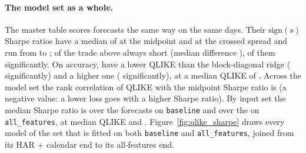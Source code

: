 \paragraph{The model set as a whole.} The master table scores \cmMasterN{} forecasts the %
same way on the same days. Their $\mathrm{sign}(s)$ Sharpe ratios have a median of
\cmMasterMedSh{} at the midpoint and \cmMasterMedShX{} at the crossed spread and run from
\cmMasterShMin{} to \cmMasterShMax; \cmMasterVsShortAbove{} of the \cmMasterVsShortN{}
trade above always short (median difference \cmMasterVsShortMed), \cmMasterVsShortAboveSig{}
of them significantly. On accuracy, \cmMasterQVsRefBelow{} have a lower QLIKE than the
block-diagonal ridge (\cmMasterQVsRefBelowSig{} significantly) and \cmMasterQVsRefAbove{} a
higher one (\cmMasterQVsRefAboveSig{} significantly), at a median QLIKE of \cmMasterMedQ.
Across the model set the rank correlation of QLIKE with the midpoint Sharpe ratio is
\cmMasterRankCorr{} (a negative value: a lower loss goes with a higher Sharpe ratio). By
input set the median Sharpe ratio is \cmMasterMedShBase{} over the \cmMasterNBase{} forecasts
on \texttt{baseline} and \cmMasterMedShAll{} over the \cmMasterNAll{} on \texttt{all\_features},
at median QLIKE \cmMasterMedQBase{} and \cmMasterMedQAll.
Figure~\ref{fig:qlike_sharpe} draws every model of the set that is fitted on both
\texttt{baseline} and \texttt{all\_features}, joined from its HAR + calendar end to its
all-features end.

